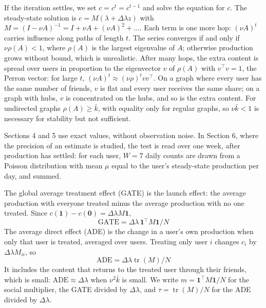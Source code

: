 \documentclass[final,5p,times,twocolumn,number]{elsarticle}
\begin{document}
If the iteration settles, we set $c = c^t = c^{t-1}$  and solve the equation for $c$. The steady-state solution is $c = M(\lambda + \Delta\lambda z)$  with $M = (I - \nu A)^{-1} = I + \nu A + (\nu A)^2 + \dots$. Each term is one more hop: $(\nu A)^t$  carries influence along paths of length $t$. The series converges if and only if $\nu\rho(A) < 1$, where $\rho(A)$  is the largest eigenvalue of $A$; otherwise production grows without bound, which is unrealistic. After many hops, the extra content is spread over users in proportion to the eigenvector $v$  of $\rho(A)$  with $v^{\top}v = 1$, the Perron vector: for large $t$, $(\nu A)^t \approx (\nu\rho)^t vv^{\top}$. On a graph where every user has the same number of friends, $v$  is flat and every user receives the same share; on a graph with hubs, $v$  is concentrated on the hubs, and so is the extra content. For undirected graphs $\rho(A) \geq \bar k$, with equality only for regular graphs, so $\nu\bar k < 1$  is necessary for stability but not sufficient.


Sections 4 and 5 use exact values, without observation noise. In Section 6, where the precision of an estimate is studied, the test is read over one week, after production has settled: for each user, $W = 7$  daily counts are drawn from a Poisson distribution with mean $\mu$  equal to the user's steady-state production per day, and summed.


The global average treatment effect (GATE) is the launch effect: the average production with everyone treated minus the average production with no one treated. Since $c(\mathbf{1}) - c(\mathbf{0}) = \Delta\lambda M\mathbf{1}$,
\begin{equation}\mathrm{GATE} = \Delta\lambda\,\mathbf{1}^{\top}M\mathbf{1}/N\label{eq:gate}\end{equation}
The average direct effect (ADE) is the change in a user's own production when only that user is treated, averaged over users. Treating only user $i$  changes $c_i$  by $\Delta\lambda M_{ii}$, so
\begin{equation}\mathrm{ADE} = \Delta\lambda\operatorname{tr}(M)/N\label{eq:ade}\end{equation}
It includes the content that returns to the treated user through their friends, which is small: $\mathrm{ADE} \approx \Delta\lambda$  when $\nu^2\bar k$  is small. We write $m = \mathbf{1}^{\top}M\mathbf{1}/N$  for the social multiplier, the GATE divided by $\Delta\lambda$, and $\tau = \operatorname{tr}(M)/N$  for the ADE divided by $\Delta\lambda$.
\end{document}
